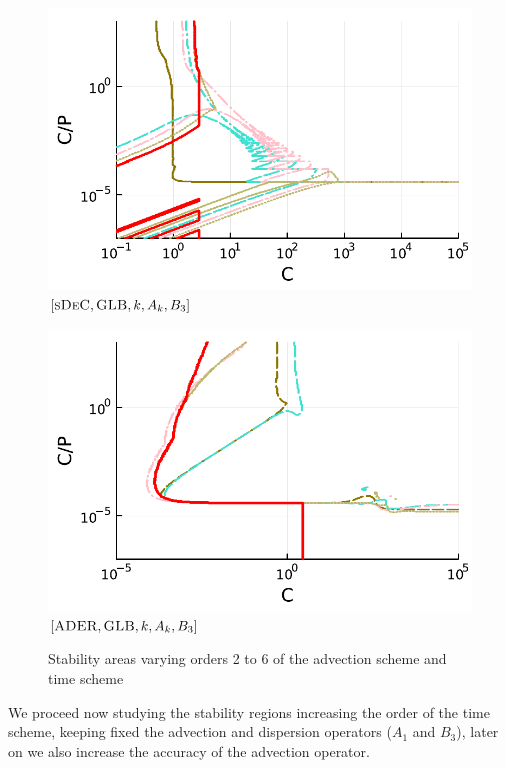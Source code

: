 \begin{figure}
\begin{minipage}[t]{0.325\textwidth}
		\includegraphics[width=\textwidth]{pdf/pdepics/disp/IMEXDeC_subtimesteps_gaussLobatto_disp_advTMM_2-6_newE.pdf}
		\small$[\textsc{sDeC}, \textsc{GLB},k,A_k,B_3]$\par
	\end{minipage}
	\begin{minipage}[t]{0.325\textwidth}
		\centering
		\includegraphics[width=\textwidth]{pdf/pdepics/disp/IMEXADER_gaussLobatto_disp_advTMM_2-6_newE.pdf}
		\small$[\textsc{ADER}, \textsc{GLB},k,A_k,B_3]$\par
	\end{minipage}
	\caption{Stability areas varying orders 2 to 6 of the advection scheme and time scheme}
	\label{fig: disp_alladv_GLB}
\end{figure}
We proceed now studying the stability regions increasing the order of the time scheme, keeping fixed the advection and dispersion operators ($A_1$ and $B_3$), later on we also increase the accuracy of the advection operator.
